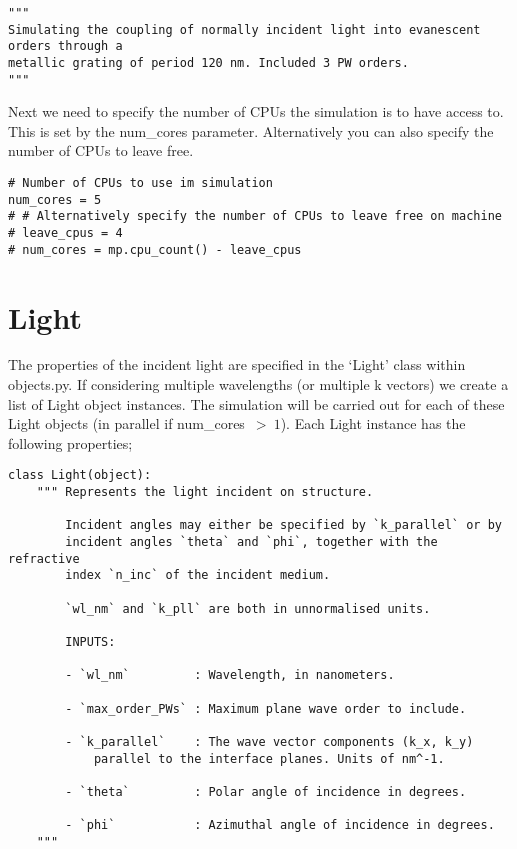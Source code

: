 \documentclass[11pt,a4paper,twoside]{report}
\begin{document}
\begin{lstlisting}
"""
Simulating the coupling of normally incident light into evanescent orders through a 
metallic grating of period 120 nm. Included 3 PW orders.
"""
\end{lstlisting}

Next we need to specify the number of CPUs the simulation is to have access to. This is set by the num\_cores parameter. Alternatively you can also specify the number of CPUs to leave free.

\begin{lstlisting}
# Number of CPUs to use im simulation
num_cores = 5
# # Alternatively specify the number of CPUs to leave free on machine
# leave_cpus = 4 
# num_cores = mp.cpu_count() - leave_cpus
\end{lstlisting}




\section{Light}
The properties of the incident light are specified in the `Light' class within objects.py. If considering multiple wavelengths (or multiple k vectors) we create a list of Light object instances. The simulation will be carried out for each of these Light objects (in parallel if num\_cores~$>~1$). Each Light instance has the following properties;

\begin{lstlisting}
class Light(object):
    """ Represents the light incident on structure.

        Incident angles may either be specified by `k_parallel` or by
        incident angles `theta` and `phi`, together with the refractive
        index `n_inc` of the incident medium.

        `wl_nm` and `k_pll` are both in unnormalised units.

        INPUTS:

        - `wl_nm`         : Wavelength, in nanometers.

        - `max_order_PWs` : Maximum plane wave order to include.

        - `k_parallel`    : The wave vector components (k_x, k_y)
            parallel to the interface planes. Units of nm^-1.

        - `theta`         : Polar angle of incidence in degrees.

        - `phi`           : Azimuthal angle of incidence in degrees.
    """
\end{lstlisting}
\end{document}
